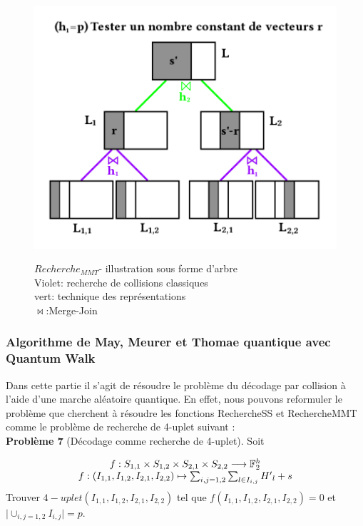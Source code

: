 \documentclass[12pt,openany]{report}
\begin{document}
\begin{figure}[htp]
\centering
\begin{center}

\includegraphics[scale=1.2]{./arbre}
\caption{$Recherche_{MMT}$- illustration sous forme d'arbre \\
Violet: recherche de collisions classiques\\
vert: technique des représentations\\
$\Join $:Merge-Join} \cite{Ghazal}
\label{fig:mmt1}
\end{center}

\end{figure}

\subsubsection{Algorithme de May, Meurer et Thomae quantique avec Quantum Walk}
 
Dans cette partie il s’agit de résoudre le problème
du décodage par collision à l’aide d’une marche aléatoire quantique. En effet,
nous pouvons reformuler le problème que cherchent à résoudre les fonctions
RechercheSS et RechercheMMT comme le problème de recherche de 4-uplet
suivant :\\
\textbf{Problème 7} \cite{Ghazal} (Décodage comme recherche de 4-uplet). Soit 



\[
\left.
\begin{array}{c  c}
f: S_{1,1} \times S_{1,2}  \times S_{2,1}\times S_{2,2}\longrightarrow \mathbb{F}_{2}^{h} \\
f:(I_{1,1},I_{1,2},I_{2,1},I_{2,2})\mapsto \sum_{i,j=1,2}\sum_{l \in I_{i,j}} {H'}_{l}+s  
   
\end{array}
\right.
\]
Trouver  $4-uplet(I_{1,1},I_{1,2},I_{2,1},I_{2,2})$  tel que $ f(I_{1,1},I_{1,2},I_{2,1},I_{2,2})=0$   et
$ \mid \cup_{i,j=1,2}I_{i,j} \mid=p $.\\
\end{document}
